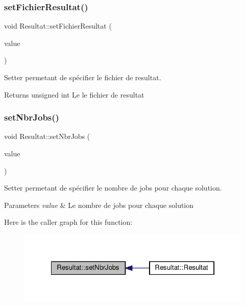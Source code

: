 \subsubsection{\texorpdfstring{set\+Fichier\+Resultat()}{setFichierResultat()}}
{\footnotesize\ttfamily void Resultat\+::set\+Fichier\+Resultat (\begin{DoxyParamCaption}\item[{const Q\+String \&}]{value }\end{DoxyParamCaption})}



Setter permetant de spécifier le fichier de resultat. 

\begin{DoxyReturn}{Returns}
unsigned int Le le fichier de resultat 
\end{DoxyReturn}
\mbox{\label{classResultat_a61b3cb17971280228fe9e1ce20e906fa}} 
\subsubsection{\texorpdfstring{set\+Nbr\+Jobs()}{setNbrJobs()}}
{\footnotesize\ttfamily void Resultat\+::set\+Nbr\+Jobs (\begin{DoxyParamCaption}\item[{unsigned int}]{value }\end{DoxyParamCaption})}



Setter permetant de spécifier le nombre de jobs pour chaque solution. 


\begin{DoxyParams}{Parameters}
{\em value} & Le nombre de jobs pour chaque solution \\
\hline
\end{DoxyParams}
Here is the caller graph for this function\+:\nopagebreak
\begin{figure}[H]
\begin{center}
\leavevmode
\includegraphics[width=322pt]{classResultat_a61b3cb17971280228fe9e1ce20e906fa_icgraph}
\end{center}
\end{figure}
\mbox{\label{classResultat_a5de638751a3dadde3d8765663a3d1403}} 
